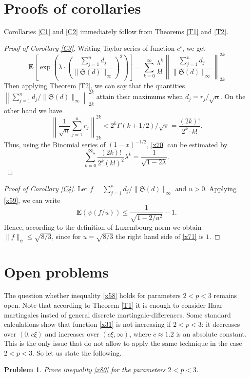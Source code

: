 \documentclass[12pt,reqno,fleqn]{amsart}
\newtheorem{problem}{Problem}
\theoremstyle{definition}
\theoremstyle{definition}
\theoremstyle{remark}
\def\ZS{\ensuremath{\mathfrak S}}
\def\ZE{\ensuremath{\mathbf E}}
\numberwithin{equation}{section}
\newcommand {\e }[1]{\eqref{#1}}
\newcommand {\cor }[1]{Corollary \ref{#1}}
\newcommand {\trm }[1]{Theorem \ref{#1}}
\begin{document}
\section{Proofs of corollaries}
Corollaries \ref{C1} and \ref{C2} immediately follow from Theorems \ref{T1} and \ref{T2}.
\begin{proof}[Proof of \cor{C3}]
Writing Taylor series of function $e^{t}$, we get
\begin{equation}\label{x70}
	\ZE\left[\exp\left(\lambda\cdot \left(\frac{\sum_{j=1}^nd_j}{\|\ZS(d)\|_\infty}\right)^2\right)\right]=
	\sum_{k=0}^\infty\frac{\lambda^k}{ k!}\left\|\frac{\sum_{j=1}^nd_j}{\|\ZS(d)\|_\infty}\right\|_{2k}^{2k}
\end{equation}
Then applying \trm{T2}, we can say that the quantities $\left\|\sum_{j=1}^nd_j/\|\ZS(d)\|_\infty\right\|_{2k}^{2k}$ attain their maximums when $d_j=r_j/\sqrt{n}$. On the other hand we have
\begin{equation}
	\left\|\frac{1}{\sqrt{n}}\sum_{j=1}^nr_j\right\|_{2k}^{2k}<2^{k}\Gamma(k+1/2)/\sqrt{\pi}=\frac{(2k)!}{2^k \cdot k!}.
\end{equation} 
Thus, using the Binomial series of $(1-x)^{-1/2}$, \e{x70} can be estimated by
\begin{equation*}
	\sum_{k=0}^\infty \frac{(2k)!}{2^k(k!)^2}\lambda^k=\frac{1}{\sqrt{1-2\lambda}}.
\end{equation*}
\end{proof}
\begin{proof}[Proof of \cor{C4}]
Let $f=\sum_{j=1}^nd_j/\|\ZS(d)\|_\infty$
and $u>0$. Applying \e{x59}, we can write
\begin{equation}\label{x71}
\ZE(\psi(f/u))\le \frac{1}{\sqrt{1-2/u^2}}-1.
\end{equation}
Hence, according to the definition of Luxembourg norm we obtain $\|f\|_\psi\le \sqrt{8/3}$, since for $u=\sqrt{8/3}$ the right hand side of \e{x71} is $1$.
\end{proof}
\section{Open problems} 
The question whether inequality \e{x58} holds for parameters $2<p<3$ remains open. Note that according to \trm{T1} it is enough to consider Haar martingales insted of general discrete martingale-differences. Some standard calculations show that function \e{x31} is not increasing if $2<p<3$: it decreases over $(0,c\xi)$ and increases over $(c\xi, \infty)$, where $c\approx 1.2$ is an absolute constant. This is the only issue that do not allow to apply the same technique in the case $2<p<3$. So let us state the following.
\begin{problem}
	Prove inequality \e{x80} for the parameters $2<p<3$.
\end{problem}
\end{document}
